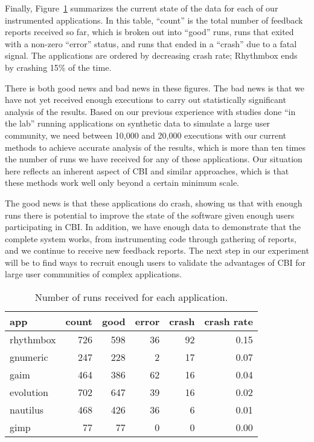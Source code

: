 \documentclass[times,10pt,twocolumn]{article}
\begin{document}
Finally, Figure~\ref{reports-per-app} summarizes the current state of
the data for each of our instrumented applications.  In this table,
``count'' is the total number of feedback reports received so far,
which is broken out into ``good'' runs, runs that exited with a
non-zero ``error'' status, and runs that ended in a ``crash'' due to a
fatal signal.  The applications are ordered by decreasing crash rate;
Rhythmbox ends by crashing 15\% of the time.

There is both good news and bad news in these figures.  The bad news
is that we have not yet received enough executions to carry out statistically
significant analysis of the results.  Based on our previous experience with
studies done ``in the lab'' running applications on synthetic data to simulate
a large user community, we need between 10,000 and 20,000 executions with
our current methods to achieve accurate analysis of the results, which is
more than ten times the number of runs we have received for any of these
applications.  Our situation here reflects an inherent aspect of CBI and
similar approaches, which is that these methods work well only beyond a
certain minimum scale.

The good news is that these applications do crash,
showing us that with enough runs there is potential to improve the state
of the software given enough users participating in CBI.  In addition,
we have enough data to demonstrate that the complete system works, from
instrumenting code through gathering of reports, and we continue to
receive new feedback reports.  The next step in our experiment will be
to find ways to recruit enough users to validate the advantages of CBI
for large user communities of complex applications.


\begin{table}
  \centering
  \begin{tabular}{lrrrrr}
    app & count & good & error & crash & crash rate \\ \hline
    rhythmbox & 726 & 598 & 36 & 92 & 0.15 \\
    gnumeric & 247 & 228 & 2 & 17 & 0.07 \\
    gaim & 464 & 386 & 62 & 16 & 0.04 \\
    evolution & 702 & 647 & 39 & 16 & 0.02 \\
    nautilus & 468 & 426 & 36 & 6 & 0.01 \\
    gimp & 77 & 77 & 0 & 0 & 0.00
  \end{tabular}
  \caption{Number of runs received for each application.}  
  \label{reports-per-app}
\end{table}
\end{document}
